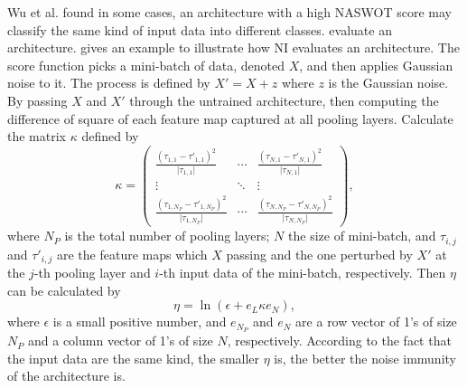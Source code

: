\documentclass[sigconf]{acmart}
\begin{document}
    Wu et al. \cite{10092788} found in some cases, an architecture with a high %
    NASWOT score may classify the same kind of input data into different classes. 
    evaluate an architecture.  gives an example to illustrate how 
    NI evaluates an architecture. The score function picks a 
    mini-batch of data, denoted $X$, and then applies Gaussian noise to it. 
    The process is defined by $X'=X+z$ where $z$ is the Gaussian noise. 
    By passing $X$ and $X'$ through the untrained architecture, then computing 
    the difference of square of each feature map captured at all pooling layers. 
    Calculate the matrix $\kappa$ defined by 
    \begin{equation}
        \label{equ:ni_kappa}
        \kappa=\begin{pmatrix}\frac{(\tau_{1,1}-\tau'_{1,1})^2}{\lvert \tau_{1,1}\rvert}&\cdots&\frac{(\tau_{N,1}-\tau'_{N,1})^2}{\lvert \tau_{N,1}\rvert}\\\vdots&\ddots&\vdots\\\frac{(\tau_{1,N_P}-\tau'_{1,N_P})^2}{\lvert \tau_{1,N_P}\rvert}&\cdots&\frac{(\tau_{N,N_P}-\tau'_{N,N_P})^2}{\lvert \tau_{N,N_P}\rvert}\end{pmatrix},
    \end{equation}
    where $N_P$ is the total number of pooling layers; $N$ the size of mini-batch, 
    and $\tau_{i,j}$ and $\tau'_{i,j}$ are the feature maps which $X$ passing and 
    the one perturbed by $X'$ at the $j$-th pooling layer and $i$-th input 
    data of the mini-batch, respectively. 
    Then $\eta$ can be calculated by 
    \begin{equation}
        \label{equ:ni_eta}
        \eta=\ln(\epsilon+e_L\kappa e_N),
    \end{equation}
    where $\epsilon$ is a small positive number, and $e_{N_P}$ and $e_N$ are a row 
    vector of 1's of size $N_P$ and a column vector of 1's of size $N$, respectively. 
    According to the fact that the input data are the same kind, the smaller $\eta$ 
    is, the better the noise immunity of the architecture is. 
\end{document}
